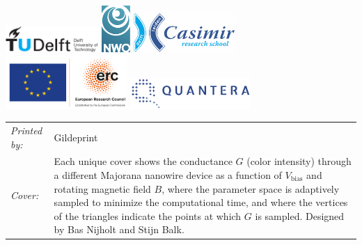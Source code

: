 \begin{titlepage}
\vspace{2\bigskipamount}
\begin{center}
    \includegraphics[height=0.4in]{title/logos/tudelft}
    \hspace{2em}
    \includegraphics[height=0.7in]{title/logos/nwo}
    \hspace{2em}
    \includegraphics[height=0.6in]{title/logos/casimir} \\
    \includegraphics[height=0.8in]{title/logos/eu-erc}
    \includegraphics[width=1.8in]{title/logos/quantera}
\end{center}

\vspace{1\bigskipamount}

\noindent
\begin{tabular}{@{}p{}@{}p{}}
    \textit{Printed by:} & Gildeprint \\[\medskipamount]
    \textit{Cover:} & Each unique cover shows the conductance $G$ (color intensity) through a different Majorana nanowire device as a function of $V_\textrm{bias}$ and rotating magnetic field $B$, where the parameter space is adaptively sampled to minimize the computational time, and where the vertices of the triangles indicate the points at which $G$ is sampled.
    Designed by Bas Nijholt and Stijn Balk.
\end{tabular}


\end{titlepage}
